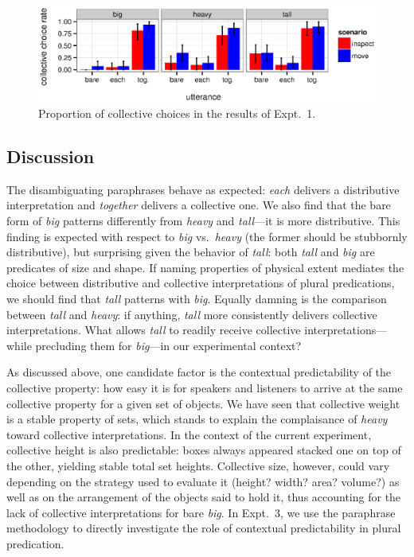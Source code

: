 \documentclass[linguex]{sp}
\begin{document}
\begin{figure}[h]
	\centering
	\includegraphics[width=\linewidth]{plots/expt1bootsci2.eps}
	\vspace{-15pt}
	\caption{Proportion of collective choices in the results of Expt.~1.}\label{results2}
\end{figure}


\subsection{Discussion}

The disambiguating paraphrases behave as expected: \emph{each} delivers a distributive interpretation and \emph{together} delivers a collective one. We also find that the bare form of \emph{big} patterns differently from \emph{heavy} and \emph{tall}---it is more distributive. This finding is expected with respect to \textit{big} vs.~\textit{heavy} (the former should be stubbornly distributive), but surprising given the behavior of \textit{tall}: both \emph{tall} and \emph{big} are predicates of size and shape. If naming properties of physical extent mediates the choice between distributive and collective interpretations of plural predications, we should find that \emph{tall} patterns with \emph{big}. Equally damning is the comparison between \emph{tall} and \emph{heavy}: if anything, \emph{tall} more consistently delivers collective interpretations. What allows \emph{tall} to readily receive collective interpretations---while precluding them for \emph{big}---in our experimental context? 

As discussed above, one candidate factor is the contextual predictability of the collective property: how easy it is for speakers and listeners to arrive at the same collective property for a given set of objects. We have seen that collective weight is a stable property of sets, which stands to explain the complaisance of \emph{heavy} toward collective interpretations. In the context of the current experiment, collective height is also predictable: boxes  always appeared stacked one on top of the other, yielding stable total set heights. Collective size, however, could vary depending on the strategy used to evaluate it (height? width? area? volume?) as well as on the arrangement of the objects said to hold it, thus accounting for the lack of collective interpretations for bare \emph{big}. In Expt.~3, we use the paraphrase methodology to directly investigate the role of contextual predictability in plural predication.
\end{document}
